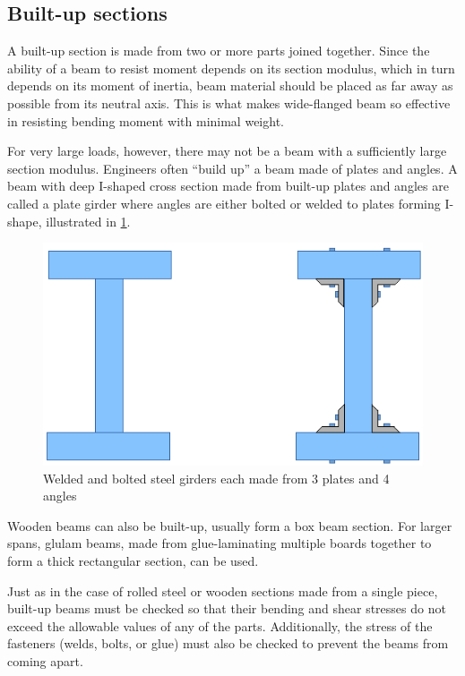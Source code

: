 \documentclass[
10pt,
a4paper,
openany,
svgnames,
]{book}
\begin{document}
\subsection{Built-up sections}

A built-up section is made from two or more parts joined together. Since the ability of a beam to resist moment depends on its section modulus, which in turn depends on its moment of inertia, beam material should be placed as far away as possible from its neutral axis. This is what makes wide-flanged beam so effective in resisting bending moment with minimal weight.

For very large loads, however, there may not be a beam with a sufficiently large section modulus. Engineers often “build up” a beam made of plates and angles. A beam with deep I-shaped cross section made from built-up plates and angles are called a plate girder where angles are either bolted or welded to plates forming I-shape, illustrated in \cref{fig: steel fabricated beam}.

\begin{figure}[h]
  \centering
  \includegraphics[scale=0.8]{pictures/Simple-load-bearing/steel-fab-beams}
  \caption{Welded and bolted steel girders each made from 3 plates and 4 angles }
  \label{fig: steel fabricated beam}
\end{figure}

Wooden beams can also be built-up, usually form a box beam section. For larger spans, glulam beams, made from glue-laminating multiple boards together to form a thick rectangular section, can be used.

Just as in the case of rolled steel or wooden sections made from a single piece, built-up beams must be checked so that their bending and shear stresses do not exceed the allowable values of any of the parts. Additionally, the stress of the fasteners (welds, bolts, or glue) must also be checked to prevent the beams from coming apart.
\end{document}
